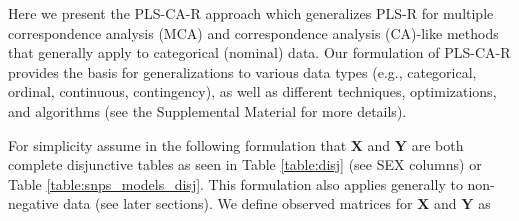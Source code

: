 \documentclass[12pt]{article}
\begin{document}
Here we present the PLS-CA-R approach which generalizes PLS-R for
multiple correspondence analysis (MCA) and correspondence analysis
(CA)-like methods that generally apply to categorical (nominal) data.
Our formulation of PLS-CA-R provides the basis for generalizations to
various data types (e.g., categorical, ordinal, continuous,
contingency), as well as different techniques, optimizations, and
algorithms (see the Supplemental Material for more details).

For simplicity assume in the following formulation that \({\mathbf X}\)
and \({\mathbf Y}\) are both complete disjunctive tables as seen in
Table \ref{table:disj} (see SEX columns) or Table
\ref{table:snps_models_disj}. This formulation also applies generally to
non-negative data (see later sections). We define observed matrices for
\({\mathbf X}\) and \({\mathbf Y}\) as
\end{document}
